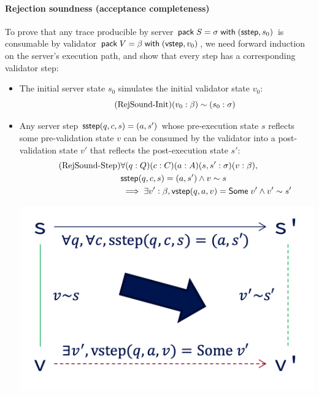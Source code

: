\paragraph{Rejection soundness (acceptance completeness)}
To prove that any trace producible by server $\mathsf{pack}\;S=\sigma\;\mathsf{with}\;(\mathsf{sstep},s_0)$
is consumable by validator $\mathsf{pack}\;V=\beta\;\mathsf{with}\;(\mathsf{vstep},v_0)$, we need forward
induction on the server's execution path, and show that every step has a
corresponding validator step:
\begin{itemize}
\item The initial server state $s_0$ simulates the initial validator state $v_0$:
  \begin{equation}
    \tag{RejSound-Init}
    \label{eq:rs1}
    (v_0:\beta)\sim (s_0:\sigma)
  \end{equation}
\item Any server step $\mathsf{sstep}(q,c,s)=(a,s')$ whose pre-execution state $s$
  reflects some pre-validation state $v$ can be consumed by the validator
  into a post-validation state $v'$ that reflects the post-execution state $s'$:
  \begin{align*}
    \tag{RejSound-Step}
    \label{eq:rs2}
    &\forall(q:Q)(c:C)(a:A)(s,s':\sigma)(v:\beta),\\
    &\mathsf{sstep}(q,c,s)=(a,s')\wedge v\sim s\\
    &\implies\exists v':\beta,\mathsf{vstep}(q,a,v)=\mathsf{Some}\;v'\wedge v'\sim s'
  \end{align*}
  \begin{center}
    \includegraphics[width=.5\textwidth]{figures/sound}
  \end{center}
\end{itemize}

